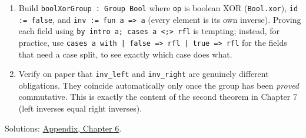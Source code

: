 \begin{enumerate}
\item
  Build \texttt{boolXorGroup : Group Bool} where \texttt{op} is boolean XOR (\texttt{Bool.xor}), \texttt{id := false}, and \texttt{inv := fun a => a} (every element is its own inverse). Proving each field using \texttt{by intro a; cases a <;> rfl} is tempting; instead, for practice, use \texttt{cases a with | false => rfl | true => rfl} for the fields that need a case split, to see exactly which case does what.
\item
  Verify on paper that \texttt{inv\_\allowbreak{}left} and \texttt{inv\_\allowbreak{}right} are genuinely different obligations. They coincide automatically only once the group has been \emph{proved} commutative. This is exactly the content of the second theorem in Chapter 7 (left inverses equal right inverses).
\end{enumerate}

Solutions: \hyperref[sec:14-appendix-solutions:05-chapter-6:1]{Appendix, Chapter 6}.


